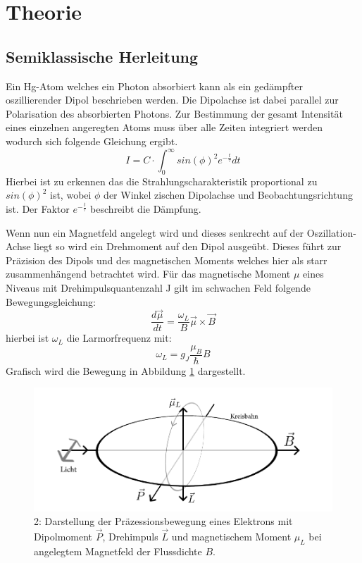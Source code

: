 \section{Theorie}
\subsection{Semiklassische Herleitung}
Ein Hg-Atom welches ein Photon absorbiert kann als ein gedämpfter oszillierender Dipol beschrieben werden. Die Dipolachse ist dabei parallel zur Polarisation des absorbierten Photons. Zur Bestimmung der gesamt Intensität eines einzelnen angeregten Atoms muss über alle Zeiten integriert werden wodurch sich folgende Gleichung ergibt.
\begin{equation}
	I=C\cdot \int_{0}^{\infty}sin(\phi)^2e^{-\frac{t}{\tau}}dt
\end{equation}
Hierbei ist zu erkennen das die Strahlungscharakteristik proportional zu $sin(\phi)^2$ ist, wobei $\phi$ der Winkel zischen Dipolachse und Beobachtungsrichtung ist. Der Faktor $e^{-\frac{t}{\tau}}$ beschreibt die Dämpfung.\par
Wenn nun ein Magnetfeld angelegt wird und dieses senkrecht auf der Oszillation-Achse liegt so wird ein Drehmoment auf den Dipol ausgeübt. Dieses führt zur Präzision des Dipols und des magnetischen Moments welches hier als starr zusammenhängend betrachtet wird. Für das magnetische Moment $\mu$ eines Niveaus mit Drehimpulsquantenzahl J gilt
im schwachen Feld folgende Bewegungsgleichung:
\begin{equation}
\frac{d\vec{\mu}}{dt}=\frac{\omega_L}{B}\vec{\mu}\times\vec{B}
\label{Präzesion}
\end{equation}
hierbei ist $\omega_L$ die Larmorfrequenz mit:
\begin{equation}
	\omega_L=g_J\frac{\mu_B}{\hbar}B
\end{equation}
Grafisch wird die Bewegung in Abbildung \ref{Präzesionsbild} dargestellt.
\begin{figure}[ht]
	\includegraphics[scale=0.8]{Bild/TestP}
	\centering
	\caption{2: Darstellung der Präzessionsbewegung eines Elektrons mit Dipolmoment $\vec{P}$, Drehimpuls $\vec{L}$ und magnetischem Moment $\mu_L$ bei angelegtem Magnetfeld der Flussdichte $B$.}
	\label{Präzesionsbild}
\end{figure}\\
